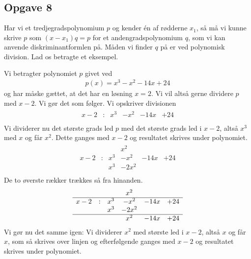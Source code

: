 \subsection*{Opgave 8}
Har vi et tredjegradspolynomium $p$ og kender én af rødderne $x_1$, så må vi kunne skrive $p$ som $(x-x_1)q = p$ for et andengradspolynomium $q$, som vi kan anvende diskriminantformlen på. Måden vi finder $q$ på er ved polynomisk division. Lad os betragte et eksempel.
\begin{exa}
	Vi betragter polynomiet $p$ givet ved
	\begin{align*}
		p(x) = x^3 - x^2 - 14x + 24
	\end{align*}
	og har måske gættet, at det har en løsning $x = 2$. Vi vil altså gerne dividere $p$ med $x - 2$. Vi gør det som 
	følger. Vi opskriver divisionen
	\begin{align*}
		\begin{array}{cccccc}
			x-2 & : & x^3 & - x^2 & -14x & +24 \\
		\end{array}
	\end{align*}
	Vi dividerer nu det største grads led $p$ med det største grads led i $x-2$, altså $x^3$ med $x$ og får $x^2$. Dette 
	ganges med $x-2$ og resultatet skrives under polynomiet. 
	\begin{align*}
		\begin{array}{cccccc}
			& & & x^2 & & 		\\
			\hline
			x-2 & : & x^3 & - x^2 & -14x & +24 \\
			& &x^3 & -2x^2 & &  \\
		\end{array}
	\end{align*}
	De to øverste rækker trækkes så fra hinanden.
	\begin{align*}
		\begin{array}{cccccc}
			& & & x^2 & & 		\\
			\hline
			x-2 & : & x^3 & - x^2 & -14x & +24 \\
			& &x^3 & -2x^2 & &  \\
			\hline
			& & & x^2 & -14x & +24 \\
		\end{array}
	\end{align*}
	Vi gør nu det samme igen: Vi dividerer $x^2$ med største led i $x-2$, altså $x$ og får $x$, som så skrives over 
	linjen og efterfølgende ganges med $x-2$ og resultatet skrives under polynomiet.
	\begin{align*}
		\begin{array}{cccccc}

\end{array}
\end{align*}
\end{exa}
